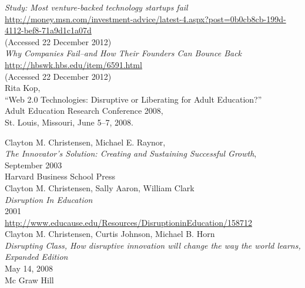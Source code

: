 \documentclass[a4paper,10pt]{book}
\begin{document}
\begin{thebibliography}{9}




  \emph{Study: Most venture-backed technology startups fail }\\
  \url{http://money.msn.com/investment-advice/latest-4.aspx?post=0b0cb8cb-199d-4112-bef8-71a9d1c1a07d}\\
  (Accessed 22 December 2012)\\
  
  
  
  \emph{Why Companies Fail--and How Their Founders Can Bounce Back}\\
  \url{http://hbswk.hbs.edu/item/6591.html}\\
  (Accessed 22 December 2012)\\
  

  Rita Kop, \\
  “Web 2.0 Technologies: Disruptive or Liberating for Adult Education?” \\
  Adult Education Research Conference 2008, \\
  St. Louis, Missouri, June 5–7, 2008.

   Clayton M. Christensen, Michael E. Raynor,\\
   \emph{The Innovator's Solution: Creating and Sustaining Successful Growth},\\
   September 2003 \\
   Harvard Business School Press\\
 
   Clayton M. Christensen, Sally Aaron, William Clark\\
   \emph{Disruption In Education}\\
    2001\\
   \url{http://www.educause.edu/Resources/DisruptioninEducation/158712}\\

    
   Clayton M. Christensen, Curtis Johnson, Michael B. Horn\\
   \emph{Disrupting Class, How disruptive innovation will change the way the world learns, Expanded Edition}\\
    May 14, 2008\\
    Mc Graw Hill\\


\end{thebibliography}
\end{document}
